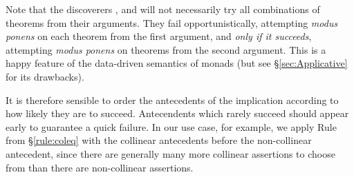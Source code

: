 Note that the discoverers ,  and  will not necessarily try all combinations of theorems from their arguments. They fail opportunistically, attempting \emph{modus ponens} on each theorem from the first argument, and \emph{only if it succeeds}, attempting \emph{modus ponens} on theorems from the second argument. This is a happy feature of the data-driven semantics of monads (but see \S\ref{sec:Applicative} for its drawbacks). 

It is therefore sensible to order the antecedents of the implication according to how likely they are to succeed. Antecendents which rarely succeed should appear early to guarantee a quick failure. In our use case, for example, we apply Rule  from \S\ref{rule:coleq} with the collinear antecedents before the non-collinear antecedent, since there are generally many more collinear assertions to choose from than there are non-collinear assertions.







